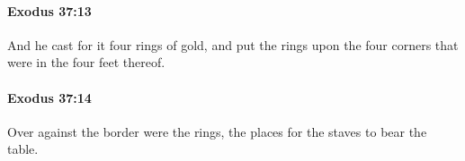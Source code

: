 		\paragraph{Exodus 37:13} %
			\label{EXODUS-37-13}

			And he cast for it four rings of gold, and put the rings upon the four corners that were in the four feet thereof.


		\paragraph{Exodus 37:14} %
			\label{EXODUS-37-14}

			Over against the border were the rings, the places for the staves to bear the table.


